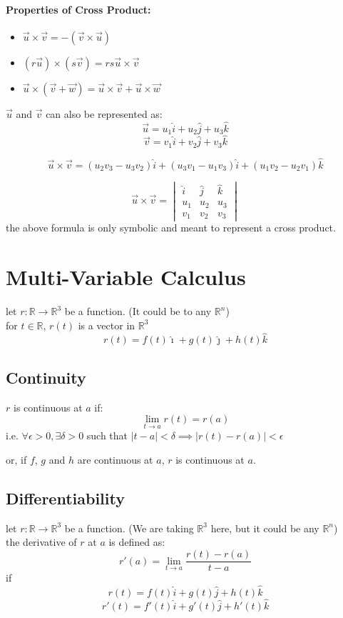 \documentclass{article}
\begin{document}
\paragraph*{Properties of Cross Product: }
\begin{itemize}
    \item $\vec{u} \times \vec{v} = - (\vec{v} \times \vec{u})$
    \item $(r\vec{u}) \times (s \vec{v}) = rs \vec{u} \times \vec{v}$
    \item $ \vec{u} \times (\vec{v} + \vec{w}) = \vec{u} \times \vec{v} + \vec{u} \times \vec{w}$
\end{itemize}

$\vec{u}$ and $\vec{v}$ can also be represented as: 
\[ \vec{u} = u_1 \hat{i} + u_2 \hat{j} + u_3 \hat{k}\]
\[ \vec{v} = v_1 \hat{i} + v_2 \hat{j} + v_3 \hat{k}\]

\[\vec{u} \times \vec{v} = (u_2 v_3 - u_3 v_2)\hat{i} + (u_3 v_1 - u_1 v_3)\hat{i} + (u_1 v_2 - u_2 v_1)\hat{k}\]

\[\vec{u} \times \vec{v} = \begin{vmatrix}
    \hat{i} & \hat{j} & \hat{k} \\
    u_1 & u_2 & u_3\\
    v_1 & v_2 & v_3
\end{vmatrix}
\]
the above formula is only symbolic and meant to represent a cross product.

\section{Multi-Variable Calculus}

let $r: \mathbb{R} \rightarrow \mathbb{R}^3$ be a function.
(It could be to any $\mathbb{R}^n$)\\
for $t \in \mathbb{R}$, $r(t)$ is a vector in $\mathbb{R}^3$\\
\[r(t) = f(t)\hat{\imath} + g(t)\hat{\jmath} + h(t)\hat{k}\]

\subsection{Continuity}
$r$ is continuous at $a$ if: 
\[\lim_{t \rightarrow a} r(t) = r(a)\]
i.e. $\forall \epsilon > 0, \exists \delta > 0$ such that $|t - a| < \delta \implies |r(t) - r(a)| < \epsilon$

or, if $f$, $g$ and $h$ are continuous at $a$, $r$ is continuous at $a$.

\subsection{Differentiability}
let $r: \mathbb{R} \rightarrow \mathbb{R}^3$ be a function. (We are taking $\mathbb{R}^3$ here, but it could be any $\mathbb{R}^n$)\\
the derivative of $r$ at $a$ is defined as:
\[ r'(a) = \lim_{t \rightarrow a} \frac{r(t) - r(a)}{t - a}\]
if 
\[r(t) = f(t)\hat{i} + g(t)\hat{j} + h(t)\hat{k}\]
\[r'(t) = f'(t)\hat{i} + g'(t)\hat{j} + h'(t)\hat{k}\]
\end{document}
